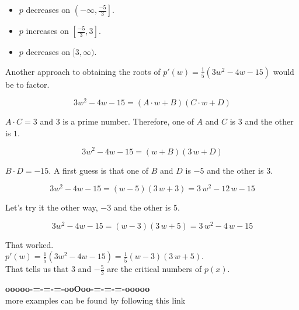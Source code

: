 \documentclass{ximera}
\begin{document}
\begin{itemize}
\item $p$ decreases on $\left(-\infty, \frac{-5}{3}\right]$.
\item $p$ increases on $\left[\frac{-5}{3}, 3\right]$.
\item $p$ decreases on $[3, \infty)$.
\end{itemize}



Another approach to obtaining the roots of $p'(w) = \frac{1}{5}(3w^2 - 4w - 15)$ would be to factor. 


\[
3w^2 - 4w - 15      = (A \cdot w + B)(C \cdot w + D) 
\]

$A \cdot C = 3$ and $3$ is a prime number.  Therefore, one of $A$ and $C$ is $3$ and the other is $1$.



\[
3w^2 - 4w - 15      = (w + B)(3 \, w + D) 
\]



$B \cdot D = -15$.  A first guess is that one of $B$ and $D$ is $-5$ and the other is $3$. 


\[
3w^2 - 4w - 15      = (w - 5)(3 \, w + 3) = 3 \, w^2 -12 \, w - 15
\]



Let's try it the other way, $-3$ and the other is $5$.



\[
3w^2 - 4w - 15     = (w - 3)(3 \, w + 5) = 3 \, w^2  -4 \, w - 15
\]



That worked. \\



$p'(w) = \frac{1}{5}(3w^2 - 4w - 15) = \frac{1}{5} (w - 3)(3 \, w + 5)$. \\


That tells us that $3$ and $-\frac{5}{3}$ are the critical numbers of $p(x)$.






\begin{center}
\textbf{\textcolor{green!50!black}{ooooo-=-=-=-ooOoo-=-=-=-ooooo}} \\

more examples can be found by following this link\\ 

\end{center}
\end{document}
